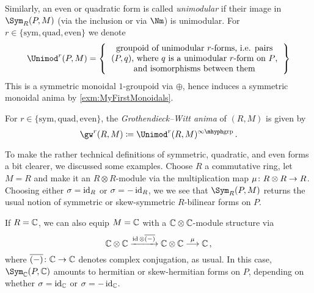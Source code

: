 Similarly, an even or quadratic form is called \emph{unimodular} if their image in $\Sym_R(P,M)$ (via the inclusion or via $\Nm$) is unimodular. For $r\in\{\text{sym},\text{quad}, \text{even}\}$ we denote
\begin{equation*}
	\Unimod^r(P,M)=\left\{\begin{tabular}{c}
		groupoid of unimodular $r$-forms, i.e. pairs\\
		$(P,q)$, where $q$ is a unimodular $r$-form on $P$,\\
		and isomorphisms between them
	\end{tabular}\right\}
\end{equation*}
This is a symmetric monoidal $1$-groupoid via $\oplus$, hence induces a symmetric monoidal anima by \cref{exm:MyFirstMonoidals}.
\begin{smalldefi}[Karoubi]
	For $r\in\{\text{sym},\text{quad}, \text{even}\}$, the \emph{Grothendieck--Witt anima} of $(R,M)$ is given by
	\begin{equation*}
		\gw^r(R,M)\coloneqq \Unimod^r(R,M)^\inftygrp\,.
	\end{equation*}
\end{smalldefi}
To make the rather technical definitions of symmetric, quadratic, and even forms a bit clearer, we discussed some examples. Choose $R$ a commutative ring, let $M=R$ and make it an $R\otimes R$-module via the multiplication map $\mu\colon R\otimes R\morphism R$. Choosing either $\sigma=\operatorname{id}_R$ or $\sigma=-\operatorname{id}_R$, we we see that $\Sym_R(P,M)$ returns the usual notion of symmetric or skew-symmetric $R$-bilinear forms on $P$.

If $R=\mathbb{C}$, we can also equip $M=\mathbb{C}$ with a $\mathbb{C}\otimes\mathbb{C}$-module structure via
\begin{equation*}
	\IC\otimes\IC\xrightarrow{\id\otimes \overline{(-)}}\IC\otimes \IC\morphism[\mu]\IC\,,
\end{equation*}
where $\overline{(-)}\colon \IC\morphism\IC$ denotes complex conjugation, as usual. In this case, $\Sym_\IC(P,\IC)$ amounts to hermitian or skew-hermitian forms on $P$, depending on whether $\sigma=\operatorname{id}_{\mathbb{C}}$ or $\sigma=-\operatorname{id}_{\mathbb{C}}$.

